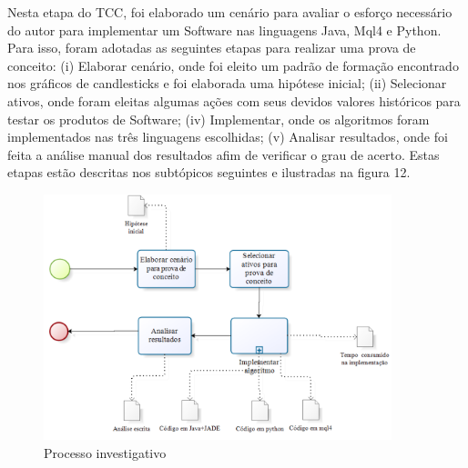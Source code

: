Nesta etapa do TCC, foi elaborado um cenário para avaliar o esforço necessário do autor para implementar um Software nas linguagens Java, Mql4 e Python. Para isso, foram adotadas as seguintes etapas para realizar uma prova de conceito: (i) Elaborar cenário, onde foi eleito um padrão de formação encontrado nos gráficos de candlesticks e foi elaborada uma hipótese inicial; (ii) Selecionar  ativos, onde foram eleitas algumas ações com seus devidos valores históricos para testar os produtos de  Software; (iv) Implementar, onde os algoritmos foram implementados nas três linguagens escolhidas; (v) Analisar resultados, onde foi feita a análise manual dos resultados afim de verificar o grau de acerto. Estas etapas estão descritas nos subtópicos seguintes e ilustradas na figura 12.

\begin{figure}[h]
\centering
\label{f12}
\includegraphics[width=0.9\textwidth]{figuras/f09}
\caption{Processo investigativo }

\end{figure}

